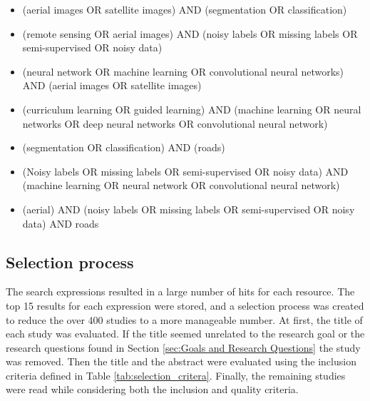 \begin{itemize}
	\item (aerial images OR satellite images) AND (segmentation OR classification)
	\item (remote sensing OR aerial images) AND (noisy labels OR missing labels OR semi-supervised OR noisy data)
	\item (neural network OR machine learning OR convolutional neural networks) AND (aerial images OR satellite images)
	\item (curriculum learning OR guided learning) AND (machine learning OR neural networks OR deep neural networks OR  convolutional neural network) 
	\item (segmentation OR classification) AND (roads)
	\item (Noisy labels OR missing labels OR semi-supervised OR noisy data) AND (machine learning OR neural network OR convolutional neural network)
	\item (aerial) AND (noisy labels OR missing labels OR semi-supervised OR noisy data) AND roads
\end{itemize}

\subsection{Selection process}
The search expressions resulted in a large number of hits for each resource. The top 15 results for each expression were stored, and a  selection process was created to reduce the over 400 studies to a more manageable number. At first, the title of each study was evaluated. If the title seemed unrelated to the research goal or the research questions found in Section \ref{sec:Goals and Research Questions}
the study was removed. Then the title and the abstract were evaluated using the inclusion criteria defined in Table \ref{tab:selection_critera}. Finally, the remaining studies were read while considering both the inclusion and quality criteria.

